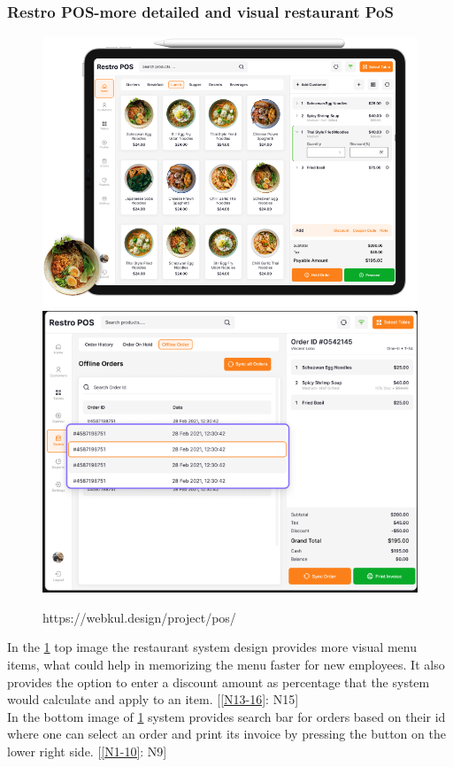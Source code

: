 \documentclass{article}
\begin{document}
\subsubsection{Restro POS-more detailed and visual restaurant PoS}
\begin{figure}[H]
    \centering
    \includegraphics[width=0.9\linewidth]{HCI/images/restaurant_UI_2.png}
    \includegraphics[width=0.8\linewidth]{HCI/images/invoice.png}
    \caption{https://webkul.design/project/pos/}
    \label{fig:restUI2}
\end{figure}
\noindent
In the \cref{fig:restUI2} top image the restaurant system design provides more visual menu items, what could help in memorizing the menu faster for new employees. It also provides the option to enter a discount amount as percentage that the system would calculate and apply to an item. [\cref{N13-16}: N15]\\ In the bottom image of \cref{fig:restUI2} system provides search bar for orders based on their id where one can select an order and print its invoice by pressing the button on the lower right side. [\cref{N1-10}: N9]
\end{document}

